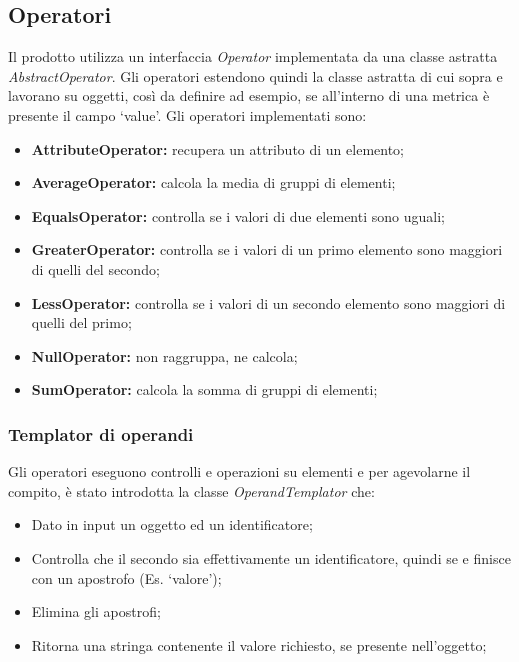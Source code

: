     \subsection{Operatori}

	Il prodotto \ProjectName{} utilizza un interfaccia \textit{Operator} implementata da una classe astratta \textit{AbstractOperator}.
	Gli operatori estendono quindi la classe astratta di cui sopra e lavorano su oggetti, così da definire ad esempio, se all'interno di una metrica è 		presente il campo `value'. Gli operatori implementati sono:
	\begin{itemize}
                \item \textbf{AttributeOperator:} recupera un attributo di un elemento;
		\item \textbf{AverageOperator:} calcola la media di gruppi di elementi;
		\item \textbf{EqualsOperator:} controlla se i valori di due elementi sono uguali;
		\item \textbf{GreaterOperator:} controlla se i valori di un primo elemento sono maggiori di quelli del secondo;
		\item \textbf{LessOperator:} controlla se i valori di un secondo elemento sono maggiori di quelli del primo;
		\item \textbf{NullOperator:} non raggruppa, ne calcola;
		\item \textbf{SumOperator:} calcola la somma di gruppi di elementi;
	\end{itemize}

	\subsubsection{Templator di operandi}

		Gli operatori eseguono controlli e operazioni su elementi e per agevolarne il compito, è stato introdotta la classe \textit{OperandTemplator} che:
		\begin{itemize}
		        \item Dato in input un oggetto ed un identificatore;
			\item Controlla che il secondo sia effettivamente un identificatore, quindi se e finisce con un apostrofo (Es. `valore');
			\item Elimina gli apostrofi;
			\item Ritorna una stringa contenente il valore richiesto, se presente nell'oggetto;
		\end{itemize}

